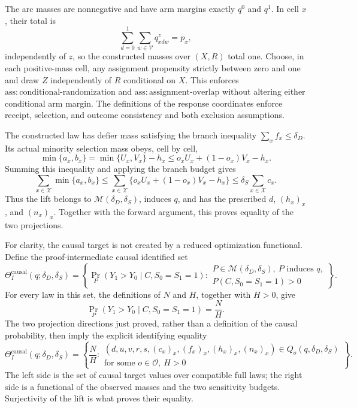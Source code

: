 The arc masses are nonnegative and have arm margins exactly \(q^0\) and \(q^1\).  In cell \(x\), their total is
\[
 \sum_{d=0}^1\sum_{w\in\mathcal V}q^z_{xdw}=p_x,
\]
independently of \(z\), so the constructed masses over \((X,R)\) total one.  Choose, in each positive-mass cell, any assignment propensity strictly between zero and one and draw \(Z\) independently of \(R\) conditional on \(X\).  This enforces \(\mathrm{ass:conditional\text{-}randomization}\) and \(\mathrm{ass:assignment\text{-}overlap}\) without altering either conditional arm margin.  The definitions of the response coordinates enforce receipt, selection, and outcome consistency and both exclusion assumptions.

The constructed law has defier mass satisfying the branch inequality \(\sum_xf_x\leq\delta_D\).  Its actual minority selection mass obeys, cell by cell,
\[
 \min\{a_x,b_x\}
 =\min\{U_x,V_x\}-h_x
 \leq o_xU_x+(1-o_x)V_x-h_x.
\]
Summing this inequality and applying the branch budget gives
\[
 \sum_{x\in\mathcal X}\min\{a_x,b_x\}
 \leq
 \sum_{x\in\mathcal X}\{o_xU_x+(1-o_x)V_x-h_x\}
 \leq\delta_S\sum_{x\in\mathcal X}c_x.
\]
Thus the lift belongs to \(\mathcal M(\delta_D,\delta_S)\), induces \(q\), and has the prescribed \(d\), \((h_x)_x\), and \((n_x)_x\).  Together with the forward argument, this proves equality of the two projections.

For clarity, the causal target is not created by a reduced optimization functional.  Define the proof-intermediate causal identified set
\[
 \Theta_I^{\mathrm{causal}}(q;\delta_D,\delta_S)
 =\left\{
 \Pr_P(Y_1>Y_0\mid C,S_0=S_1=1):
 \begin{array}{l}
 P\in\mathcal M(\delta_D,\delta_S),\ P\text{ induces }q,\\
 P(C,S_0=S_1=1)>0
 \end{array}
 \right\}.
\]
For every law in this set, the definitions of \(N\) and \(H\), together with \(H>0\), give
\[
 \Pr_P(Y_1>Y_0\mid C,S_0=S_1=1)=\frac{N}{H}.
\]
The two projection directions just proved, rather than a definition of the causal probability, then imply the explicit identifying equality
\[
 \Theta_I^{\mathrm{causal}}(q;\delta_D,\delta_S)
 =\left\{\frac NH:
 \begin{array}{l}
 (d,u,v,r,s,(c_x)_x,(f_x)_x,(h_x)_x,(n_x)_x)
 \in Q_o(q,\delta_D,\delta_S)\\
 \text{for some }o\in\mathcal O,\ H>0
 \end{array}
 \right\}.
\]
The left side is the set of causal target values over compatible full laws; the right side is a functional of the observed masses and the two sensitivity budgets.  Surjectivity of the lift is what proves their equality.

